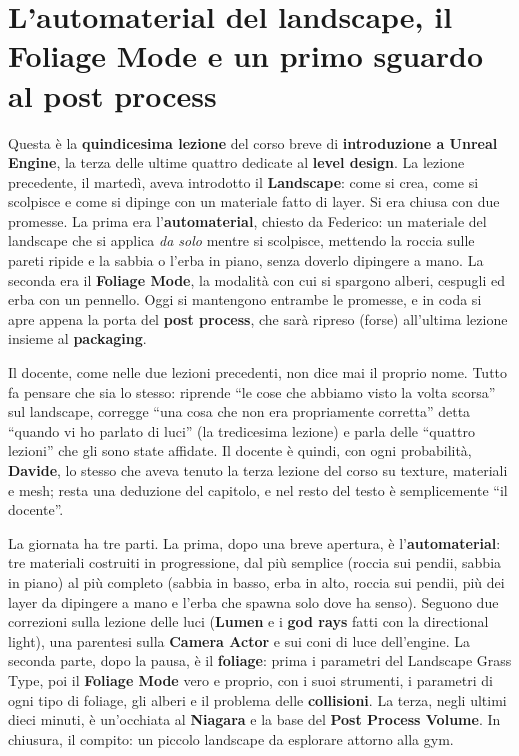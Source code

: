 \chapter[Automaterial, foliage e post process]{L'automaterial del landscape, il Foliage
Mode e un primo sguardo al post process}
\label{ue15:cap:automaterial}

Questa è la \textbf{quindicesima lezione} del corso breve di \textbf{introduzione a
Unreal Engine}, la terza delle ultime quattro dedicate al \textbf{level design}. La lezione
precedente, il martedì, aveva introdotto il \textbf{Landscape}: come si crea, come si
scolpisce e come si dipinge con un materiale fatto di layer. Si era chiusa con due promesse.
La prima era l'\textbf{automaterial}, chiesto da Federico: un materiale del landscape che si
applica \emph{da solo} mentre si scolpisce, mettendo la roccia sulle pareti ripide e la
sabbia o l'erba in piano, senza doverlo dipingere a mano. La seconda era il \textbf{Foliage
Mode}, la modalità con cui si spargono alberi, cespugli ed erba con un pennello. Oggi si
mantengono entrambe le promesse, e in coda si apre appena la porta del \textbf{post
process}, che sarà ripreso (forse) all'ultima lezione insieme al \textbf{packaging}.

Il docente, come nelle due lezioni precedenti, non dice mai il proprio nome. Tutto fa pensare
che sia lo stesso: riprende ``le cose che abbiamo visto la volta scorsa'' sul landscape,
corregge ``una cosa che non era propriamente corretta'' detta ``quando vi ho parlato di
luci'' (la tredicesima lezione) e parla delle ``quattro lezioni'' che gli sono state
affidate. Il docente è quindi, con ogni probabilità, \textbf{Davide}, lo stesso che aveva
tenuto la terza lezione del corso su texture, materiali e mesh; resta una deduzione del
capitolo, e nel resto del testo è semplicemente ``il docente''.

La giornata ha tre parti. La prima, dopo una breve apertura, è l'\textbf{automaterial}:
tre materiali costruiti in progressione, dal più semplice (roccia sui pendii, sabbia in
piano) al più completo (sabbia in basso, erba in alto, roccia sui pendii, più dei layer da
dipingere a mano e l'erba che spawna solo dove ha senso). Seguono due correzioni sulla
lezione delle luci (\textbf{Lumen} e i \textbf{god rays} fatti con la directional light),
una parentesi sulla \textbf{Camera Actor} e sui coni di luce dell'engine. La seconda
parte, dopo la pausa, è il \textbf{foliage}: prima i parametri del Landscape Grass Type,
poi il \textbf{Foliage Mode} vero e proprio, con i suoi strumenti, i parametri di ogni
tipo di foliage, gli alberi e il problema delle \textbf{collisioni}. La terza, negli ultimi
dieci minuti, è un'occhiata al \textbf{Niagara} e la base del \textbf{Post Process
Volume}. In chiusura, il compito: un piccolo landscape da esplorare attorno alla gym.

